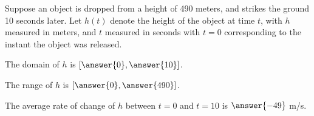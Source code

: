 \documentclass{ximera}
\author{Bobby Ramsey}
\begin{document}
 
	Suppose an object is dropped from a height of 490 meters, and strikes the ground 10 seconds later. Let $h(t)$ denote the height of the object at time $t$, with $h$
	measured in meters, and $t$ measured in seconds with $t=0$ corresponding to the instant the object was released.
	\begin{exercise}
		\begin{center}
			The domain of $h$ is $[\answer{0},\answer{10}]$.
		\end{center}
		\begin{exercise}
			\begin{center}
				The range of $h$ is $[\answer{0},\answer{490}]$.
			\end{center}
			\begin{exercise}
				\begin{center}
					The average rate of change of $h$ between $t=0$ and $t=10$ is $\answer{-49}$ m/s.
				\end{center}
			\end{exercise}
		\end{exercise}
	\end{exercise}
\end{document}
